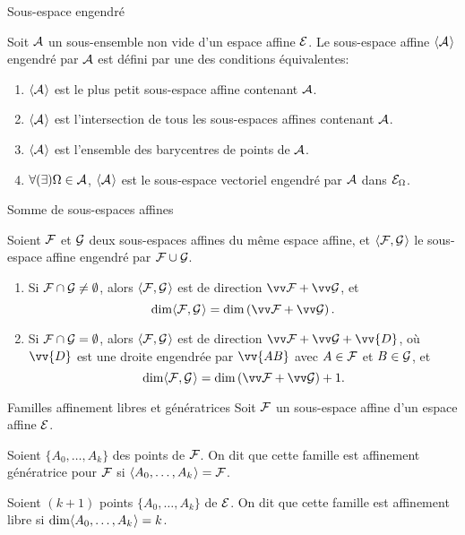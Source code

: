 \documentclass[bigger]{m53beamer}
\begin{document}
  \begin{frame}{Sous-espace engendré}
    \begin{defprop}
      Soit $\mathcal{A}$ un sous-ensemble non vide d'un espace affine $\mathcal{E}$. Le sous-espace affine $\langle{\mathcal{A}}\kern.07em\rangle$ engendré par $\mathcal{A}$ est défini par une des conditions équivalentes:
        \begin{enumerate}[<+(1)->]
          \item $\langle{\mathcal{A}}\kern.07em\rangle$ est le plus petit sous-espace affine contenant $\mathcal{A}$.
          \item $\langle{\mathcal{A}}\kern.07em\rangle$ est l'intersection de tous les sous-espaces affines contenant $\mathcal{A}$.
          \item $\langle{\mathcal{A}}\kern.07em\rangle$ est l'ensemble des barycentres de points de $\mathcal{A}$.
          \item $\forall(\exists) \Omega \in \mathcal{A}$, $\langle{\mathcal{A}}\kern.07em\rangle$ est le sous-espace vectoriel engendré par $\mathcal{A}$ dans $\mathcal{E}_{\Omega}$.
        \end{enumerate}
    \end{defprop}
  \end{frame}
  \begin{frame}{Somme de sous-espaces affines}
    \begin{proposition}
      Soient $\mathcal{F}$ et $\mathcal{G}$ deux sous-espaces affines du même espace affine, et $\langle{\mathcal{F},\mathcal{G}}\kern.07em\rangle$ le sous-espace affine engendré par $\mathcal{F} \cup \mathcal{G}$.
      \begin{enumerate}[<+(1)->]
        \item Si $\mathcal{F} \cap \mathcal{G} \neq \emptyset$, alors $\langle{\mathcal{F},\mathcal{G}}\kern.07em\rangle$ est de direction $\ev{F}+\ev{G}$\pause, et
            $$
              \dim\affspan{\ens{F},\ens{G}} = \dim \left(\ev{F}+\ev{G}\right).
            $$
        \item Si $\mathcal{F} \cap \mathcal{G} = \emptyset$, alors $\langle{\mathcal{F},\mathcal{G}}\kern.07em\rangle$ est de direction $\ev{F}+\ev{G}+\vv{D}$, où $\vv{D}$ est une droite engendrée par $\vv{AB}$ avec $A \in \mathcal{F}$ et $B \in \mathcal{G}$\pause, et
            $$
              \dim\affspan{\ens{F},\ens{G}} = \dim \left(\ev{F}+\ev{G}\right)+1.
            $$
      \end{enumerate}
    \end{proposition}
  \end{frame}
  \begin{frame}{Familles affinement libres et génératrices}
    Soit $\mathcal{F}$ un sous-espace affine d'un espace affine $\mathcal{E}$.\pause
    \begin{definition}
      Soient $\{A_{0},\ldots,A_{k}\}$ des points de $\mathcal{F}$. On dit que cette famille est \alert{affinement génératrice} pour $\mathcal{F}$ si $\langle{A_{0},\ldots,A_{k}}\kern.07em\rangle=\mathcal{F}$.
    \end{definition}\pause
    \begin{definition}
      Soient $(k+1)$ points $\{A_{0},\ldots,A_{k}\}$ de $\mathcal{E}$. On dit que cette famille est \alert{affinement libre} si $\dim\langle{A_{0},\ldots,A_{k}}\kern.07em\rangle=k$.
    \end{definition}
  \end{frame}
\end{document}
